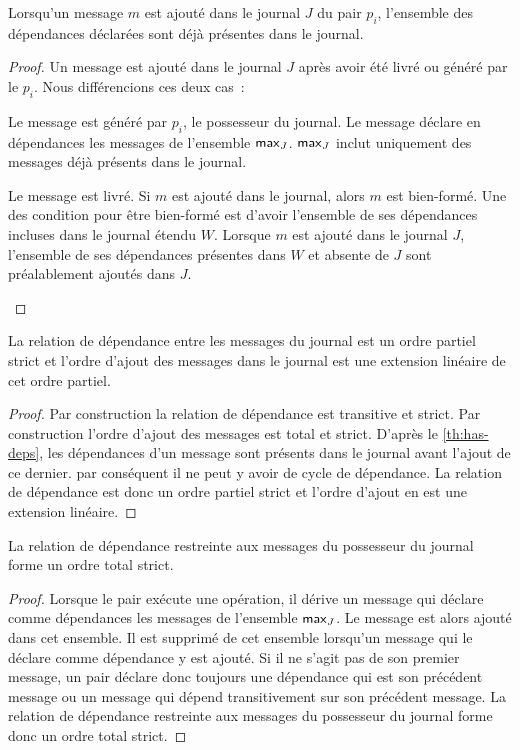 \begin{lemma}\label{th:has-deps}
Lorsqu'un message $m$ est ajouté dans le journal $J$ du pair $p_i$, l'ensemble des dépendances déclarées sont déjà présentes dans le journal.
\end{lemma}
\begin{proof}
Un message est ajouté dans le journal $J$ après avoir été livré ou généré par le $p_i$.
Nous différencions ces deux cas~:
    \begin{case}[$\trm{peer}_m = p_i$]
    Le message est généré par $p_i$, le possesseur du journal.
    Le message déclare en dépendances les messages de l'ensemble $\operatorname{\mathsf{max}}_J$.
    $\operatorname{\mathsf{max}}_J$ inclut uniquement des messages déjà présents dans le journal.
    \end{case}
    \begin{case}
    Le message est livré.
    Si $m$ est ajouté dans le journal, alors $m$ est bien-formé.
    Une des condition pour être bien-formé est d'avoir l'ensemble de ses dépendances incluses dans le journal étendu $W$.
    Lorsque $m$ est ajouté dans le journal $J$, l'ensemble de ses dépendances présentes dans $W$ et absente de $J$ sont préalablement ajoutés dans $J$.
    \end{case}
\end{proof}

\begin{lemma}
La relation de dépendance entre les messages du journal est un ordre partiel strict et l'ordre d'ajout des messages dans le journal est une extension linéaire de cet ordre partiel.
\end{lemma}
\begin{proof}
Par construction la relation de dépendance est transitive et strict.
Par construction l'ordre d'ajout des messages est total et strict.
D'après le \autoref{th:has-deps}, les dépendances d'un message sont présents dans le journal avant l'ajout de ce dernier.
par conséquent il ne peut y avoir de cycle de dépendance.
La relation de dépendance est donc un ordre partiel strict et l'ordre d'ajout en est une extension linéaire.
\end{proof}

\begin{lemma}\label{th:total-dep-owner}
La relation de dépendance restreinte aux messages du possesseur du journal forme un ordre total strict.
\end{lemma}
\begin{proof}
Lorsque le pair exécute une opération, il dérive un message qui déclare comme dépendances les messages de l'ensemble $\operatorname{\mathsf{max}}_J$.
Le message est alors ajouté dans cet ensemble.
Il est supprimé de cet ensemble lorsqu'un message qui le déclare comme dépendance y est ajouté.
Si il ne s'agit pas de son premier message, un pair déclare donc toujours une dépendance qui est son précédent message ou un message qui dépend transitivement sur son précédent message.
La relation de dépendance restreinte aux messages du possesseur du journal forme donc un ordre total strict.
\end{proof}

